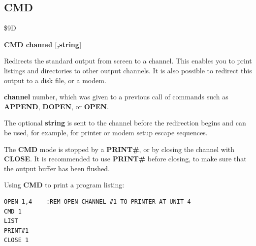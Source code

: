 \subsection{CMD}
\begin{description}[leftmargin=2cm,style=nextline]
\item [Token:] \$9D
\item [Format:] {\bf CMD channel [,string]}
\item [Usage:] Redirects the standard output
               from screen to a channel. This enables you to
               print listings and directories to other output channels.
               It is also possible to redirect this output to a disk file,
               or a modem.

               {\bf channel} number, which was given to a previous
               call of commands such as {\bf APPEND}, {\bf DOPEN}, or {\bf OPEN}.

               The optional {\bf string} is sent to the channel
               before the redirection begins and can be used,
               for example, for printer or modem setup escape sequences.

\item [Remarks:] The {\bf CMD} mode is stopped by a {\bf PRINT\#},
                 or by closing the channel with {\bf CLOSE}.
                 It is recommended to use {\bf PRINT\#}
                 before closing, to make sure that the output buffer
                 has been flushed.

\item [Example:] Using {\bf CMD} to print a program listing:
\begin{tcolorbox}[colback=black,coltext=white]
\verbatimfont{\codefont}
\begin{verbatim}
OPEN 1,4    :REM OPEN CHANNEL #1 TO PRINTER AT UNIT 4
CMD 1
LIST
PRINT#1
CLOSE 1
\end{verbatim}
\end{tcolorbox}
\end{description}


\newpage
